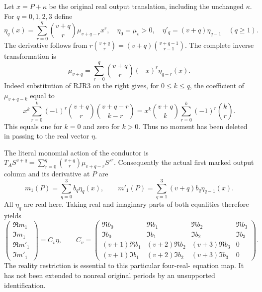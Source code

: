 \documentclass[11pt]{article}
\begin{document}
Let $x=P+\kappa$ be the original real output translation, including
the unchanged $\kappa$. For $q=0,1,2,3$ define
\[
 \eta_q(x)=\sum_{r=0}^q\binom{v+q}{r}\mu_{v+q-r}x^r,
 \quad \eta_0=\mu_v>0,\quad
 \eta'_q=(v+q)\eta_{q-1}\quad(q\ge1).
 \tag{RJR3}
\]
The derivative follows from
$r\binom{v+q}{r}=(v+q)\binom{v+q-1}{r-1}$.
The complete inverse transformation is
\[
 \mu_{v+q}=\sum_{r=0}^q\binom{v+q}{r}(-x)^r\eta_{q-r}(x).
 \tag{RJR4}
\]
Indeed substitution of RJR3 on the right gives, for $0\le k\le q$,
the coefficient of $\mu_{v+q-k}$ equal to
\[
 x^k\sum_{r=0}^k(-1)^r
 \binom{v+q}{r}\binom{v+q-r}{k-r}
 =x^k\binom{v+q}{k}\sum_{r=0}^k(-1)^r\binom kr.
\]
This equals one for $k=0$ and zero for $k>0$. Thus no moment has
been deleted in passing to the real vector $\eta$.

The literal monomial action of the conductor is
$T_AS^{v+q}=\sum_{r=0}^q\binom{v+q}{r}\mu_{v+q-r}S'^r$.
Consequently the actual first marked output column and its derivative
at $P$ are
\[
 m_1(P)=\sum_{q=0}^3b_q\eta_q(x),\qquad
 m'_1(P)=\sum_{q=1}^3(v+q)b_q\eta_{q-1}(x).
 \tag{RJR5}
\]
All $\eta_q$ are real here. Taking real and imaginary parts of both
equalities therefore yields
\[
 \begin{pmatrix}\Re m_1\\\Im m_1\\\Re m'_1\\\Im m'_1\end{pmatrix}
 =C_v\eta,\qquad
 C_v=\begin{pmatrix}
 \Re b_0&\Re b_1&\Re b_2&\Re b_3\\
 \Im b_0&\Im b_1&\Im b_2&\Im b_3\\
 (v+1)\Re b_1&(v+2)\Re b_2&(v+3)\Re b_3&0\\
 (v+1)\Im b_1&(v+2)\Im b_2&(v+3)\Im b_3&0
 \end{pmatrix}.
 \tag{RJR6}
\]
The reality restriction is essential to this particular four-real-
equation map. It has not been extended to nonreal original periods
by an unsupported identification.
\end{document}
